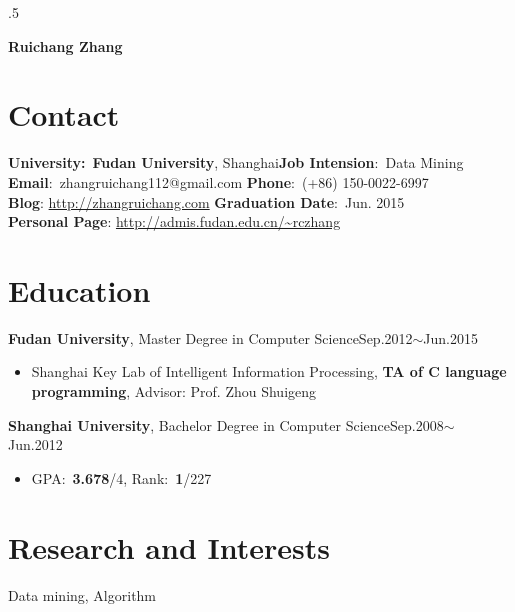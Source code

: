 \documentclass[margin]{res}
\begin{document}
 \moveleft.5\hoffset\centerline{\large\bf Ruichang Zhang}
 \iffalse
 \moveleft\hoffset\vbox{\hrule width\resumewidth height 1pt}\smallskip
 \moveleft.5\hoffset\centerline{Address: Room 502, Yifu Building, \textbf{Fudan University}, 220 Handan Road, Shanghai 200433, China.}
 \moveleft.5\hoffset\centerline{Phone: (+86) 150-0022-6997, Email: rczhang@fudan.edu.cn}
\moveleft.5\hoffset\centerline{Homepage: }%
\fi
\begin{resume}
\setlength{\parskip}{0.1em}
\section{Contact}
\textbf{University:}~{\bf Fudan University}, Shanghai\hfill \textbf{Job Intension}:~Data Mining\\
\textbf{Email}:~zhangruichang112@gmail.com \hfill  \textbf{Phone}:~(+86) 150-0022-6997\\
\textbf{Blog}: \url{http://zhangruichang.com} \hfill \textbf{Graduation Date}:~Jun. 2015\\
\textbf{Personal Page}: \url{http://admis.fudan.edu.cn/~rczhang}
\section{Education}
 {\bf Fudan University}, Master Degree in Computer Science\hfill Sep.2012$\sim$Jun.2015
 \begin{itemize} \itemsep -1pt  %
 \item Shanghai Key Lab of Intelligent Information Processing, \textbf{TA of C language programming}, Advisor: Prof. Zhou Shuigeng
 \end{itemize}
 {\bf Shanghai University}, Bachelor Degree in Computer Science\hfill Sep.2008$\sim$ Jun.2012
\begin{itemize} \itemsep -1pt %
\item GPA:~\textbf{3.678}/4, Rank:~\textbf{1}/227
\end{itemize}
\section{Research and Interests}
Data mining, Algorithm

\end{resume}
\end{document}
